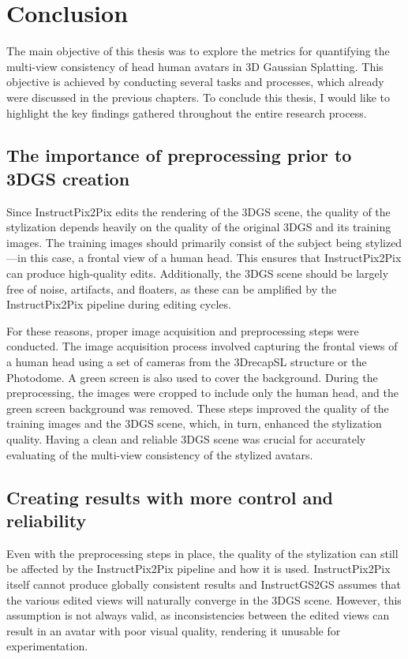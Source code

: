 \chapter{Conclusion}


The main objective of this thesis was to explore the metrics for quantifying the multi-view consistency of head human avatars in 3D Gaussian Splatting. This objective is achieved by conducting several tasks and processes, which already were discussed in the previous chapters. To conclude this thesis, I would like to highlight the key findings gathered throughout the entire research process. 

\section{The importance of preprocessing prior to 3DGS creation}
Since InstructPix2Pix edits the rendering of the 3DGS scene, the quality of the stylization depends heavily on the quality of the original 3DGS and its training images. The training images should primarily consist of the subject being stylized—in this case, a frontal view of a human head. This ensures that InstructPix2Pix can produce high-quality edits. Additionally, the 3DGS scene should be largely free of noise, artifacts, and floaters, as these can be amplified by the InstructPix2Pix pipeline during editing cycles.

For these reasons, proper image acquisition and preprocessing steps were conducted. The image acquisition process involved capturing the frontal views of a human head using a set of cameras from the 3DrecapSL structure or the Photodome. A green screen is also used to cover the background. During the preprocessing, the images were cropped to include only the human head, and the green screen background was removed. These steps improved the quality  of the training images and the 3DGS scene, which, in turn, enhanced the stylization quality. Having a clean and reliable 3DGS scene was crucial for accurately evaluating of the multi-view consistency of the stylized avatars.

\section{Creating results with more control and reliability}
Even with the preprocessing steps in place, the quality of the stylization can still be affected by the InstructPix2Pix pipeline and how it is used. InstructPix2Pix itself cannot produce globally consistent results and InstructGS2GS assumes that the various edited views will naturally converge in the 3DGS scene. However, this assumption is not always valid, as inconsistencies between the edited views can result in an avatar with poor visual quality, rendering it unusable for experimentation.

